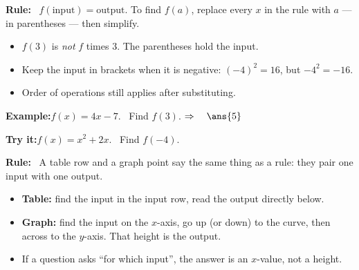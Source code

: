 \documentclass[12pt]{article}
\begin{document}


\begin{formulabox}
\textbf{Rule:} \ $f(\text{input}) = \text{output}$. To find $f(a)$, replace every
$x$ in the rule with $a$ --- in parentheses --- then simplify.
\begin{itemize}[leftmargin=0.8cm, itemsep=1pt, topsep=2pt]
  \item $f(3)$ is \emph{not} $f$ times 3. The parentheses hold the input.
  \item Keep the input in brackets when it is negative: $(-4)^2 = 16$,
        but $-4^2 = -16$.
  \item Order of operations still applies after substituting.
\end{itemize}
\end{formulabox}

\begin{examplebox}
\textbf{Example:}\quad $f(x) = 4x - 7$. \ Find $f(3)$.
$\Rightarrow\quad \ans{5}$
\end{examplebox}

\begin{tryitbox}
\textbf{Try it:}\quad $f(x) = x^2 + 2x$. \ Find $f(-4)$.\\[2pt]
\end{tryitbox}


\begin{formulabox}
\textbf{Rule:} \ A table row and a graph point say the same thing as a rule:
they pair one input with one output.
\begin{itemize}[leftmargin=0.8cm, itemsep=1pt, topsep=2pt]
  \item \textbf{Table:} find the input in the input row, read the output directly below.
  \item \textbf{Graph:} find the input on the $x$-axis, go up (or down) to the curve,
        then across to the $y$-axis. That height is the output.
  \item If a question asks ``for which input'', the answer is an $x$-value, not a height.
\end{itemize}
\end{formulabox}
\end{document}
